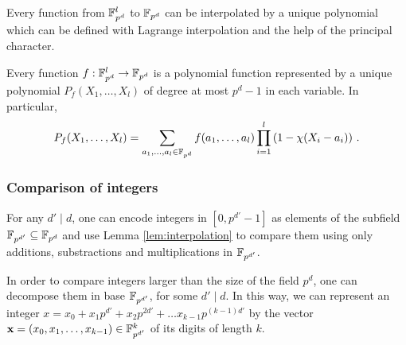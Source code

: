 Every function from $\mathbb{F}_{p^d}^l$ to $\mathbb{F}_{p^d}$ can be interpolated by a unique polynomial which can be defined with Lagrange interpolation and the help of the principal character. 
\begin{lemma}\label{lem:interpolation}
  Every function $f: \mathbb{F}_{p^d}^l \rightarrow \mathbb{F}_{p^d}$ is a polynomial function represented by a unique polynomial $P_f(X_1,\dots,X_{l})$ of degree at most $p^d - 1$ in each variable.
  In particular,
  \begin{align*}
    P_f(X_1,\dots,X_{l}) = \sum_{a_1,\dots,a_l \in \mathbb{F}_{p^d}} f(a_1,\dots,a_l) \prod_{i=1}^{l} \left(1 - \chi(X_i - a_i)\right)\,.
  \end{align*}
\end{lemma}

\subsubsection{Comparison of integers}
For any $d'\mid d$, one can encode integers in $[0,p^{d'}-1]$ as elements of the subfield $\mathbb{F}_{p^{d'}} \subseteq \mathbb{F}_{p^d}$ and use Lemma \ref{lem:interpolation} to compare them using only additions, substractions and multiplications in $\mathbb{F}_{p^{d'}}$.  

In order to compare integers larger than the size of the field $p^d$, one can decompose them in base $\mathbb{F}_{p^{d'}}$, for some $d'\mid d$. In this way, we can represent an integer $x = x_0 + x_1p^{d'} + x_2p^{2d'}+\ldots x_{k-1}p^{(k-1)d'}$ by the vector $\mathbf{x}=(x_0,x_1,\ldots,x_{k-1})\in\mathbb{F}_{p^{d'}}^k$ of its digits of length $k$.

